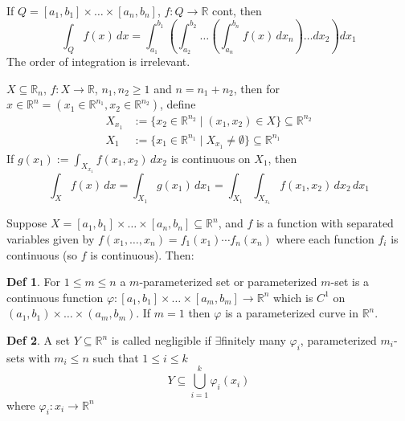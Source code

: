 \documentclass[a4paper, 10pt]{article}
\theoremstyle{definition}
\newtheorem*{definition}{Def}
\newcommand{\R}{\mathbb{R}}
\begin{document}
\begin{ntheorem*}
    If \(Q = [a_1, b_1] \times \ldots \times [a_n, b_n]\), \(f: Q \to \R\) cont, then
    \[\int_Q f(x) \, dx = \int_{a_1}^{b_1} \left(\int_{a_2}^{b_2} \ldots \left( \int_{a_n}^{b_n} f(x) \, dx_n \right) \ldots dx_2\right) dx_1\]
    The order of integration is irrelevant.
\end{ntheorem*}

\begin{ntheorem*}
    \(X \subseteq \R_n\), \(f: X \to \R\), \(n_1, n_2 \geq 1\) and \(n = n_1 + n_2\), then for \(x \in \R^n = (x_1 \in \R^{n_1}, x_2 \in \R^{n_2})\), define
    \begin{align*}
        X_{x_1} &:= \{x_2 \in \R^{n_2} \mid (x_1, x_2) \in X\} \subseteq \R^{n_2} \\
        X_1 &:= \{x_1 \in \R^{n_1} \mid X_{x_1} \neq \emptyset\} \subseteq \R^{n_1}
    \end{align*}
    If \(g(x_1):= \int_{X_{x_1}} f(x_1, x_2) \, dx_2\) is continuous on \(X_1\), then
    \[\int_X f(x) \, dx = \int_{X_1} g(x_1) \, dx_1 = \int_{X_1}\int_{X_{x_1}} f(x_1, x_2) \, dx_2 \, dx_1\]
\end{ntheorem*}

\begin{note*}
    Suppose \(X = [a_1, b_1] \times \ldots \times [a_n, b_n] \subseteq \R^n\), and \(f\) is a function with separated variables given by \(f(x_1, \ldots, x_n) = f_1(x_1) \cdots f_n(x_n)\) where each function \(f_i\) is continuous (so \(f\) is continuous). Then:

\end{note*}

\begin{definition}
    For \(1 \leq m \leq n\) a \(m\)-parameterized set or parameterized \(m\)-set is a continuous function \(\varphi: [a_1, b_1] \times \ldots \times [a_m, b_m] \to \R^n\) which is \(C^1\) on \((a_1, b_1) \times \ldots \times (a_m, b_m)\).
    If \(m = 1\) then \(\varphi\) is a parameterized curve in \(\R^n\).
\end{definition}

\begin{definition}
    A set \(Y \subseteq \R^n\) is called negligible if \(\exists\)finitely many \(\varphi_i\), parameterized \(m_i\)-sets with \(m_i \leq n\) such that \(1 \leq i \leq k\)
    \[Y \subseteq \bigcup_{i = 1}^k \varphi_i(x_i)\]
    where \(\varphi_i: x_i \to \R^n\)
\end{definition}
\end{document}

